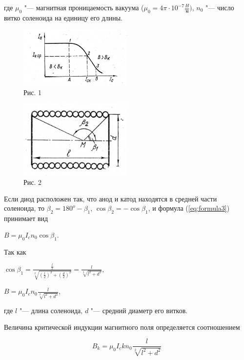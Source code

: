 где $\mu _0$ "--- магнитная проницаемость вакуума ($\mu _0 = 4 \pi \cdot 10^{-7} \frac{H}{\text{м}})$, $n_0$ "--- число витко соленоида на единицу его длины.


\begin{figure}[!h]
    \centering
    \includegraphics[width = 0.5\textwidth]{image/image1.png}
    \caption{Рис. 1}
    \label{fig:image1}
\end{figure}


\begin{figure}[!h]
    \centering
    \includegraphics[width = 0.5\textwidth]{image/image2.png}
    \caption{Рис. 2}
    \label{fig:image2}
\end{figure}


Если диод расположен так, что анод и катод находятся в средней части соленоида, то $\beta _2 = 180^o - \beta _1$, $\cos{\beta _2} = -\cos{\beta _1}$, и формула (\ref{eq:formula3}) принимает вид

$B = \mu _0 I_c n_0 \cos{\beta _1}$.

Так как 

$\cos{\beta _1} = \frac{\frac{l}{2}}{\sqrt[2]{(\frac{l}{2})^2 + (\frac{d}{2})^2}} = \frac{l}{\sqrt[2]{l^2 + d^2}}$,

$B = \mu _0 I_c n_0 \frac{l}{\sqrt[2]{l^2 + d^2}}$,

где $l$ "--- длина соленоида, $d$ "--- средний диаметр его витков.

Величина критической индукции магнитного поля определяется соотношением

\begin{equation}
    B_k = \mu _0 I_ck n_0 \frac{l}{\sqrt[2]{l^2 + d^2}}
    \label{eq:formula4}
\end{equation}

